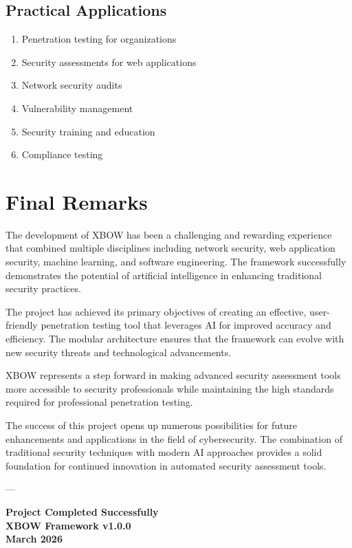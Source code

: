\documentclass[12pt,a4paper]{report}
\begin{document}
\subsection{Practical Applications}

\begin{enumerate}
    \item Penetration testing for organizations
    \item Security assessments for web applications
    \item Network security audits
    \item Vulnerability management
    \item Security training and education
    \item Compliance testing
\end{enumerate}

\section{Final Remarks}

The development of XBOW has been a challenging and rewarding experience that combined multiple disciplines including network security, web application security, machine learning, and software engineering. The framework successfully demonstrates the potential of artificial intelligence in enhancing traditional security practices.

The project has achieved its primary objectives of creating an effective, user-friendly penetration testing tool that leverages AI for improved accuracy and efficiency. The modular architecture ensures that the framework can evolve with new security threats and technological advancements.

XBOW represents a step forward in making advanced security assessment tools more accessible to security professionals while maintaining the high standards required for professional penetration testing.

The success of this project opens up numerous possibilities for future enhancements and applications in the field of cybersecurity. The combination of traditional security techniques with modern AI approaches provides a solid foundation for continued innovation in automated security assessment tools.

---

\textbf{Project Completed Successfully} \\
\textbf{XBOW Framework v1.0.0} \\
\textbf{March 2026}
\end{document}
